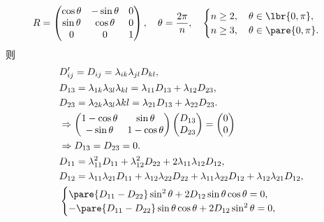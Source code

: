 \documentclass[hidelinks]{ctexart}
\begin{document}
\begin{cenum}
\begin{cenum}
        \[ R = \begin{pmatrix}
            \cos \theta & -\sin\theta & 0 \\
            \sin \theta & \cos\theta & 0 \\
            0 & 0 & 1
        \end{pmatrix},\quad \theta = \frac{2\pi}{n},\quad \begin{cases}
            n\ge 2,\quad \theta \in \lbr{0,\pi}, \\
            n\ge 3,\quad \theta \in \pare{0,\pi}.
        \end{cases} \]
        则
        \begin{align*}
            & D'_{ij} = D_{ij} = \lambda_{ik}\lambda_{jl}D_{kl}, \\
            & D_{13} = \lambda_{1k}\lambda_{3l}\lambda_{kl} = \lambda_{11}D_{13} + \lambda_{12}D_{23}, \\
            & D_{23} = \lambda_{2k}\lambda_{3l}\lambda{kl} = \lambda_{21}D_{13} + \lambda_{22}D_{23}. \\
            & \Rightarrow \begin{pmatrix}
                1 - \cos\theta & \sin\theta \\
                -\sin\theta & 1-\cos\theta
            \end{pmatrix}\begin{pmatrix}
                D_{13} \\
                D_{23}
            \end{pmatrix} = \begin{pmatrix}
                0\\ 0
            \end{pmatrix} \\
            & \Rightarrow D_{13} = D_{23} = 0. \\
            & D_{11} = \lambda_{11}^2 D_{11} + \lambda_{12}^2 D_{22} + 2\lambda_{11}\lambda_{12} D_{12}, \\
            & D_{12} = \lambda_{11}\lambda_{21}D_{11} + \lambda_{12}\lambda_{22}D_{22} + \lambda_{11}\lambda_{22}D_{12} + \lambda_{12}\lambda_{21}D_{12}, \\
            & \begin{cases}
                \pare{D_{11} - D_{22}}\sin^2\theta + 2D_{12}\sin\theta \cos\theta = 0, \\
                -\pare{D_{11} - D_{22}}\sin\theta \cos\theta + 2D_{12}\sin^2\theta = 0,
            \end{cases}\\ 

\end{align*}
\end{cenum}
\end{cenum}
\end{document}
